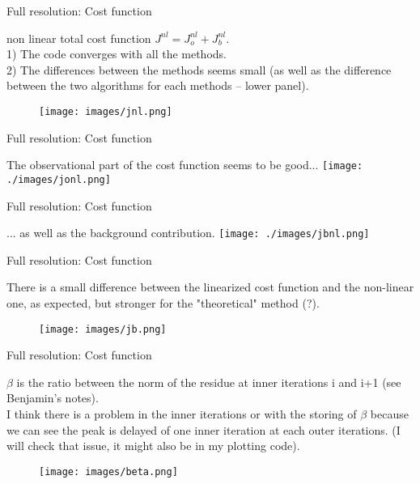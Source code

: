 \documentclass[francais]{beamer}
\begin{document}
\begin{frame}{Full resolution: Cost function}
\begin{center}
non linear total cost function $J^{nl}=J^{nl}_o + J^{nl}_b$.\\
1) The code converges with all the methods.\\
2) The differences between the methods seems small (as well as the difference between the two algorithms for each methods -- lower panel).\\
\endminipage \hfill
{}%
\begin{figure}
  \texttt{[image: images/jnl.png]}
\end{figure}
\endminipage
\end{center}
\end{frame}


\begin{frame}{Full resolution: Cost function}
\begin{center}
The observational part of the cost function seems to be good...
 \texttt{[image: ./images/jonl.png]}
\end{center}
\end{frame}

\begin{frame}{Full resolution: Cost function}
\begin{center}
... as well as the background contribution.
 \texttt{[image: ./images/jbnl.png]}
\end{center}
\end{frame}

\begin{frame}{Full resolution: Cost function}
\begin{center}
There is a small difference between the linearized cost function and the non-linear one, as expected, but stronger for the "theoretical" method (?).
\endminipage \hfill
{}%
\begin{figure}
  \texttt{[image: images/jb.png]}
\end{figure}
\endminipage
\end{center}
\end{frame}

\begin{frame}{Full resolution: Cost function}
\begin{center}
$\beta$ is the ratio between the norm of the residue at inner iterations i and i+1 (see Benjamin's notes).\\
I think there is a problem in the inner iterations or with the storing of $\beta$ because we can see the peak is delayed of one inner iteration at each outer iterations. (I will check that issue, it might also be in my plotting code).
\endminipage \hfill
{}%
\begin{figure}
  \texttt{[image: images/beta.png]}
\end{figure}
\endminipage
\end{center}
\end{frame}
\end{document}
